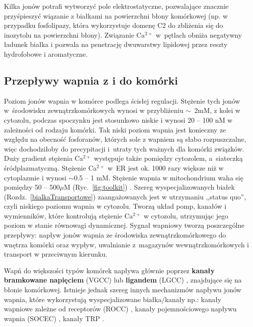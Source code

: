 Kilka jonów potrafi wytworzyć pole elektrostatyczne, pozwalające znacznie przyśpieszyć wiązanie z białkami na powierzchni błony komórkowej (np. w przypadku fosfolipazy, która wykorzystuje domenę C2 do zbliżenia się do inozytolu na powierzchni błony). Związanie Ca$^{2+}$ w~pętlach obniża negatywny ładunek białka i pozwala na penetrację dwuwarstwy lipidowej przez reszty hydrofobowe i aromatyczne.

\subsection{Przepływy wapnia z i do komórki}

Poziom jonów wapnia w komórce podlega ścisłej regulacji. Stężenie tych jonów w~środowisku zewnątrzkomórkowych wynosi w przybliżeniu $\sim$~2mM, z kolei w cytozolu, podczas spoczynku jest stosunkowo niskie i wynosi 20 -- 100 nM w zależności od rodzaju komórki. Tak niski poziom wapnia jest konieczny ze względu na obecność fosforanów, których sole z wapniem są słabo rozpuszczalne, więc dochodziłoby do precypitacji i~utraty tych ważnych dla komórki związków. Duży gradient stężenia Ca$^{2+}$ występuje także pomiędzy cytozolem, a~siateczką śródplazmatyczną. Stężenie Ca$^{2+}$ w~ER jest ok. 1000 razy większe niż w cytoplazmie i wynosi $\sim$0.5 -- 1 mM. Stężenie wapnia w mitochondrium waha się pomiędzy 50 -- 500$\mu$M (Ryc.~\ref{fig:toolkit}) \cite{Clapham2007}. Szereg wyspecjalizowanych białek (Rozdz.~\ref{bialkaTransportowe}) zaangażowanych jest w utrzymaniu ,,status quo'', czyli niskiego poziomu wapnia w cytozolu. Tworzą układ pomp, kanałów i wymienników, które kontrolują stężenie Ca$^{2+}$ w cytozolu, utrzymując jego poziom w stanie równowagi dynamicznej. Sygnał wapniowy tworzą poszczególne przepływy: napływ jonów wapnia ze środowiska zewnątrzkomórkowego do wnętrza komórki oraz wypływ, uwalnianie z~magazynów wewnątrzkomórkowych i transport w przeciwnym kierunku.

Wapń do większości typów komórek napływa głównie poprzez \textbf{kanały bramkowane napięciem} (VGCC) \cite{Zamponi2005} lub \textbf{ligandem} (LGCC) \cite{Whitfield2001}, znajdujące się na błonie komórkowej. Istnieje jednak szereg innych mechanizmów napływu jonów wapnia, które wykorzystują wyspecjalizowane białka/kanały np.: kanały wapniowe zależne od receptorów (ROCC) \cite{Schwaller2012}, kanały pojemnościowego napływu wapnia (SOCEC) \cite{Parekh2005}, kanały TRP \cite{Pedersen2005}.


